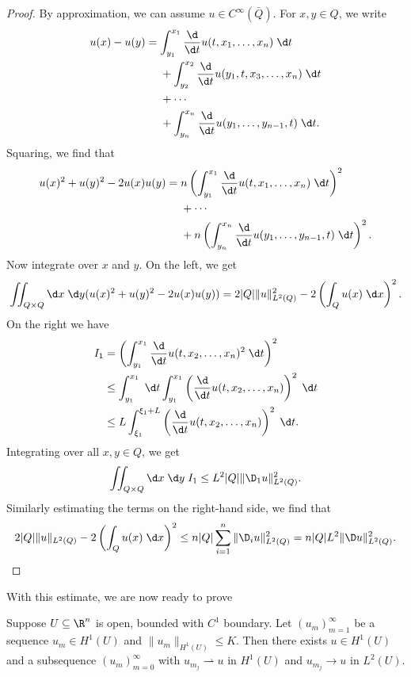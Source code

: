 \documentclass[a4paper]{article}
\begin{document}
\begin{proof}
  By approximation, we can assume $u \in C^\infty(\bar{Q})$. For $x,y \in Q$, we write
  \begin{align*}
    u(x) - u(y) &= \int_{y_1}^{x_1} \frac{\d}{\d t} u(t, x_1, \ldots, x_n)\;\d t\\
    &\hphantom{{}={}} + \int_{y_2}^{x_2} \frac{\d}{\d t} u(y_1, t, x_3, \ldots, x_n)\;\d t\\
    &\hphantom{{}={}} + \cdots\\
    &\hphantom{{}={}} + \int_{y_n}^{x_n} \frac{\d}{\d t} u(y_1, \ldots, y_{n - 1}, t)\;\d t.
  \end{align*}
  Squaring, we find that
  \begin{align*}
    u(x)^2 + u(y)^2 - 2u(x) u(y) &= n\left(\int_{y_1}^{x_1} \frac{\d}{\d t} u(t, x_1, \ldots, x_n)\;\d t\right)^2\\
    &\hphantom{{}={}} + \cdots\\
    &\hphantom{{}={}} + n\left(\int_{y_n}^{x_n} \frac{\d}{\d t} u(y_1, \ldots, y_{n - 1}, t)\;\d t\right)^2.
  \end{align*}
  Now integrate over $x$ and $y$. On the left, we get
  \[
    \iint_{Q \times Q}\d x\;\d y (u(x)^2 + u(y)^2 - 2u(x) u(y)) = 2 |Q| \|u\|_{L^2(Q)}^2 - 2 \left(\int_Q u(x) \;\d x\right)^2.
  \]
  On the right we have
  \begin{align*}
    I_1 &= \left(\int_{y_1}^{x_1} \frac{\d}{\d t} u(t, x_2, \ldots, x_n)^2 \;\d t\right)^2\\
    &\leq \int_{y_1}^{x_1} \;\d t \int_{y_1}^{x_1}\left(\frac{\d}{\d t} u(t, x_2, \ldots, x_n)\right)^2 \;\d t\\
    &\leq L \int_{\xi_1}^{\xi_1 + L} \left(\frac{\d}{\d t} u(t, x_2, \ldots, x_n)\right)^2 \;\d t.
  \end{align*}
  Integrating over all $x, y \in Q$, we get
  \[
    \iint_{Q \times Q}\d x\;\d y\; I_1 \leq L^2 |Q| \|\D_1 u\|_{L^2(Q)}^2.
  \]
  Similarly estimating the terms on the right-hand side, we find that
  \[
    2|Q| \|u\|_{L^2(Q)} - 2 \left(\int_Q u(x)\;\d x\right)^2 \leq n |Q| \sum_{i = 1}^n \|\D _i u\|^2_{L^2(Q)} = n |Q| L^2 \|\D u\|^2_{L^2(Q)}.
  \]
\end{proof}
With this estimate, we are now ready to prove
\begin{thm}
  Suppose $U \subseteq \R^n$ is open, bounded with $C^1$ boundary. Let $(u_m)_{m = 1}^\infty$ be a sequence $u_m \in H^1(U)$ and $\|u_m\|_{H^1(U)} \leq K$. Then there exists $u \in H^1(U)$ and a subsequence $(u_m)_{m = 0}^\infty$ with $u_{m_j} \rightharpoonup u$ in $H^1(U)$ and $u_{m_j} \to u$ in $L^2(U)$.
\end{thm}
\end{document}

